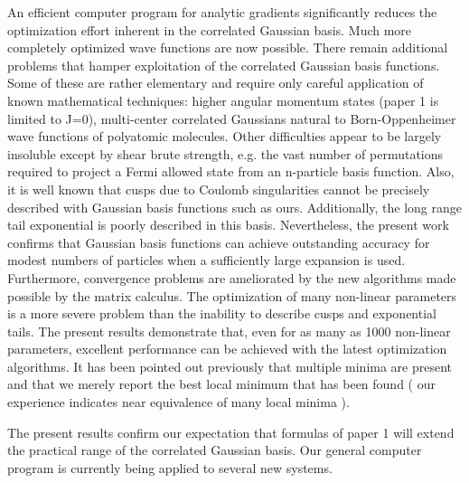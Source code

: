 \documentclass[12pt,thmsa]{article}
\begin{document}
An efficient computer program for analytic gradients significantly reduces
the optimization effort inherent in the correlated Gaussian basis. Much more
completely optimized wave functions are now possible. There remain
additional problems that hamper exploitation of the correlated Gaussian
basis functions. Some of these are rather elementary and require only
careful application of known mathematical techniques: higher angular
momentum states (paper 1 is limited to J=0), multi-center correlated
Gaussians natural to Born-Oppenheimer wave functions of polyatomic
molecules. Other difficulties appear to be largely insoluble except by shear
brute strength, e.g. the vast number of permutations required to project a
Fermi allowed state from an n-particle basis function. Also, it is well
known that cusps due to Coulomb singularities cannot be precisely described
with Gaussian basis functions such as ours. Additionally, the long range
tail exponential is poorly described in this basis. Nevertheless, the
present work confirms that Gaussian basis functions can achieve outstanding
accuracy for modest numbers of particles when a sufficiently large expansion
is used. Furthermore, convergence problems are ameliorated by the new
algorithms made possible by the matrix calculus. The optimization of many
non-linear parameters is a more severe problem than the inability to
describe cusps and exponential tails. The present results demonstrate that,
even for as many as 1000 non-linear parameters, excellent performance can be
achieved with the latest optimization algorithms. It has been pointed out
previously that multiple minima are present and that we merely report the
best local minimum that has been found ( our experience indicates near
equivalence of many local minima ).

The present results confirm our expectation that formulas of paper 1 will
extend the practical range of the correlated Gaussian basis. Our general
computer program is currently being applied to several new systems.
\end{document}
